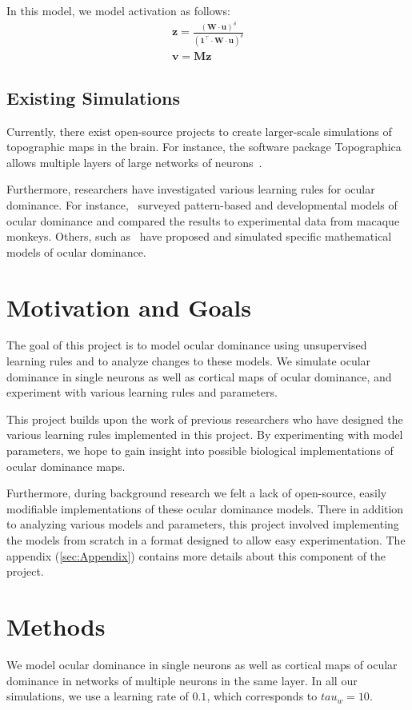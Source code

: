 \documentclass[pageno]{mat323paper}
\begin{document}
In this model, we model activation as follows:
\begin{align}
\mathbf{z}=\frac{(\mathbf{W}\cdot\mathbf{u})^\delta}{(\mathbf{1}^\top\cdot\mathbf{W}\cdot\mathbf{u})^\delta}\\
\mathbf{v}=\mathbf{M}\mathbf{z}
\end{align}

\subsection{Existing Simulations}
Currently, there exist open-source projects to create larger-scale simulations of topographic maps in the brain. For instance, the software package Topographica allows multiple layers of large networks of neurons~\cite{bednar_topographica_2009}.

Furthermore, researchers have investigated various learning rules for ocular dominance. For instance,~\cite{erwin_models_1995} surveyed pattern-based and developmental models of ocular dominance and compared the results to experimental data from macaque monkeys. Others, such as~\cite{miller_ocular_1989} have proposed and simulated specific mathematical models of ocular dominance.

\section{Motivation and Goals}
The goal of this project is to model ocular dominance using unsupervised learning rules and to analyze changes to these models. We simulate ocular dominance in single neurons as well as cortical maps of ocular dominance, and experiment with various learning rules and parameters.

This project builds upon the work of previous researchers who have designed the various learning rules implemented in this project. By experimenting with model parameters, we hope to gain insight into possible biological implementations of ocular dominance maps. 

Furthermore, during background research we felt a lack of open-source, easily modifiable implementations of these ocular dominance models. There in addition to analyzing various models and parameters, this project involved implementing the models from scratch in a format designed to allow easy experimentation. The appendix (\ref{sec:Appendix}) contains more details about this component of the project.

\section{Methods}
We model ocular dominance in single neurons as well as cortical maps of ocular dominance in networks of multiple neurons in the same layer. In all our simulations, we use a learning rate of $0.1$, which corresponds to $tau_w=10$.
\end{document}
